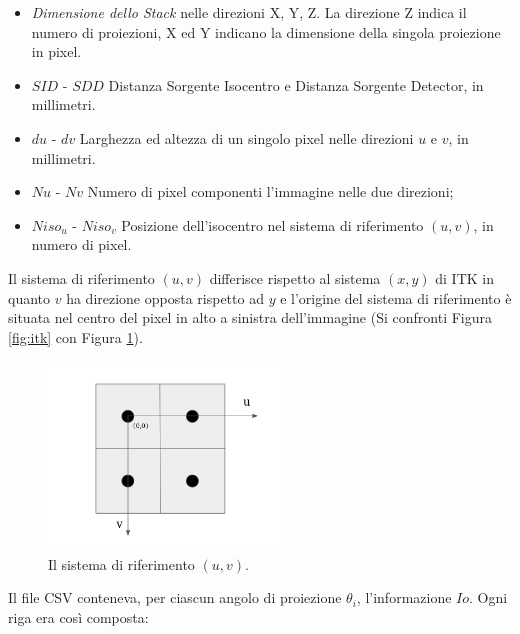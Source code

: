 \documentclass[a4paper,12pt, doubleside]{report}
\begin{document}
                    \begin{itemize}
                        \item \textit{Dimensione dello Stack} nelle direzioni X, Y, Z. La direzione Z indica il numero di proiezioni, X ed Y indicano la dimensione della singola proiezione in pixel.
                        \item $SID$ - $SDD$ Distanza Sorgente Isocentro e Distanza Sorgente Detector, in millimetri.
                        \item $du$ - $dv$ Larghezza ed altezza di un singolo pixel nelle direzioni $u$ e $v$, in millimetri.
                        \item $Nu$ - $Nv$ Numero di pixel componenti l'immagine nelle due direzioni;
                        \item $Niso_u$ - $Niso_v$ Posizione dell'isocentro nel sistema di riferimento $(u,v)$, in numero di pixel.
                    \end{itemize}
                    
                    Il sistema di riferimento $(u,v)$ differisce rispetto al sistema $(x,y)$ di ITK in quanto $v$ ha direzione opposta rispetto ad $y$ e l'origine del sistema di riferimento è situata nel centro del pixel in alto a sinistra dell'immagine (Si confronti Figura \ref{fig:itk} con Figura \ref{fig:uv}).
                    
                    \begin{figure}[h]
                        \centering
                        \includegraphics[width=0.55\textwidth]{uv}
                        \caption{Il sistema di riferimento $(u,v)$.}
                        \label{fig:uv}
                    \end{figure}
            
                    Il file CSV conteneva, per ciascun angolo di proiezione $\theta_i$, l'informazione $Io$. Ogni riga era così composta:
                    
\end{document}
